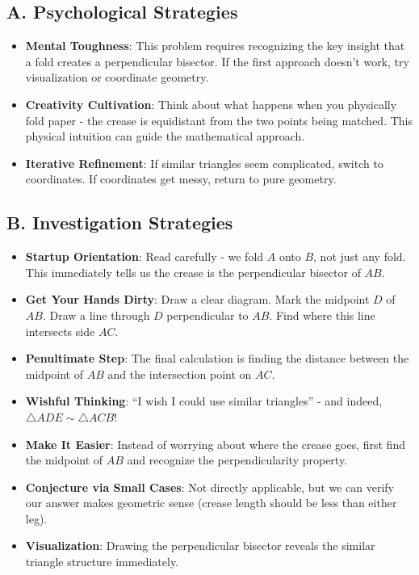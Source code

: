 \documentclass[12pt]{article}
\begin{document}
\begin{strategicbox}
\subsection*{A. Psychological Strategies}
\begin{itemize}[leftmargin=*]
    \item \textbf{Mental Toughness}: This problem requires recognizing the key insight that a fold creates a perpendicular bisector. If the first approach doesn't work, try visualization or coordinate geometry.
    \item \textbf{Creativity Cultivation}: Think about what happens when you physically fold paper - the crease is equidistant from the two points being matched. This physical intuition can guide the mathematical approach.
    \item \textbf{Iterative Refinement}: If similar triangles seem complicated, switch to coordinates. If coordinates get messy, return to pure geometry.
\end{itemize}

\subsection*{B. Investigation Strategies}
\begin{itemize}[leftmargin=*]
    \item \textbf{Startup Orientation}: Read carefully - we fold $A$ onto $B$, not just any fold. This immediately tells us the crease is the perpendicular bisector of $AB$.
    \item \textbf{Get Your Hands Dirty}: Draw a clear diagram. Mark the midpoint $D$ of $AB$. Draw a line through $D$ perpendicular to $AB$. Find where this line intersects side $AC$.
    \item \textbf{Penultimate Step}: The final calculation is finding the distance between the midpoint of $AB$ and the intersection point on $AC$.
    \item \textbf{Wishful Thinking}: ``I wish I could use similar triangles'' - and indeed, $\triangle ADE \sim \triangle ACB$!
    \item \textbf{Make It Easier}: Instead of worrying about where the crease goes, first find the midpoint of $AB$ and recognize the perpendicularity property.
    \item \textbf{Conjecture via Small Cases}: Not directly applicable, but we can verify our answer makes geometric sense (crease length should be less than either leg).
    \item \textbf{Visualization}: Drawing the perpendicular bisector reveals the similar triangle structure immediately.
\end{itemize}


\end{strategicbox}
\end{document}
